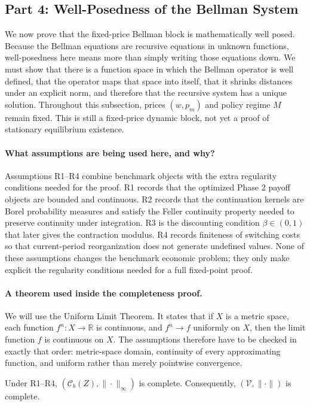 \subsection{Part 4: Well-Posedness of the Bellman System}

We now prove that the fixed-price Bellman block is mathematically well posed. Because the Bellman equations are recursive equations in unknown functions, well-posedness here means more than simply writing those equations down. We must show that there is a function space in which the Bellman operator is well defined, that the operator maps that space into itself, that it shrinks distances under an explicit norm, and therefore that the recursive system has a unique solution. Throughout this subsection, prices $(w,p_m)$ and policy regime $M$ remain fixed. This is still a fixed-price dynamic block, not yet a proof of stationary equilibrium existence.

\paragraph{What assumptions are being used here, and why?}
Assumptions R1--R4 combine benchmark objects with the extra regularity conditions needed for the proof. R1 records that the optimized Phase 2 payoff objects are bounded and continuous. R2 records that the continuation kernels are Borel probability measures and satisfy the Feller continuity property needed to preserve continuity under integration. R3 is the discounting condition $\beta\in(0,1)$ that later gives the contraction modulus. R4 records finiteness of switching costs so that current-period reorganization does not generate undefined values. None of these assumptions changes the benchmark economic problem; they only make explicit the regularity conditions needed for a full fixed-point proof.

\paragraph{A theorem used inside the completeness proof.}
We will use the Uniform Limit Theorem. It states that if $X$ is a metric space, each function $f^n:X\to\mathbb R$ is continuous, and $f^n\to f$ uniformly on $X$, then the limit function $f$ is continuous on $X$. The assumptions therefore have to be checked in exactly that order: metric-space domain, continuity of every approximating function, and uniform rather than merely pointwise convergence.

\begin{lemma}
Under R1--R4, $(\mathcal C_b(Z),\|\cdot\|_\infty)$ is complete. Consequently, $(\mathcal V,\|\cdot\|)$ is complete.
\end{lemma}

